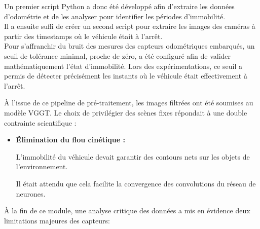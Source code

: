 \documentclass[12pt,a4paper,oneside]{report}
\begin{document}
\hspace*{0.5cm}Un premier script Python a donc été développé afin d'extraire les données d'odométrie et de les analyser pour identifier les périodes d'immobilité.\\
\hspace*{0.5cm}Il a ensuite suffi de créer un second script pour extraire les images des caméras à partir des timestamps où le véhicule était à l'arrêt.\\

\hspace*{1cm} Pour s'affranchir du bruit des mesures des capteurs odométriques embarqués, un seuil de tolérance minimal, proche de zéro, a été configuré afin de valider mathématiquement l'état d'immobilité. Lors des expérimentations, ce seuil a permis de détecter précisément les instants où le véhicule était effectivement à l'arrêt.\\

\newpage

\hspace*{1cm}À l'issue de ce pipeline de pré-traitement, les images filtrées ont été soumises au modèle VGGT. Le choix de privilégier des scènes fixes répondait à une double contrainte scientifique :\vspace{0.05cm}

\begin{itemize}[label=\textbullet, leftmargin=2cm]
    \item \textbf{Élimination du flou cinétique :}\vspace{0.05cm}

 \hspace{1cm}L'immobilité du véhicule devait garantir des contours nets sur les objets de l'environnement.\vspace{0.05cm}
 
 \hspace{0.5cm}Il était attendu que cela facilite la convergence des convolutions du réseau de neurones.
    
\end{itemize}

\vspace{0.5cm}

\hspace*{1cm} À la fin de ce module, une analyse critique des données a mis en évidence deux limitations majeures des capteurs: \vspace{0.05cm}
\end{document}
